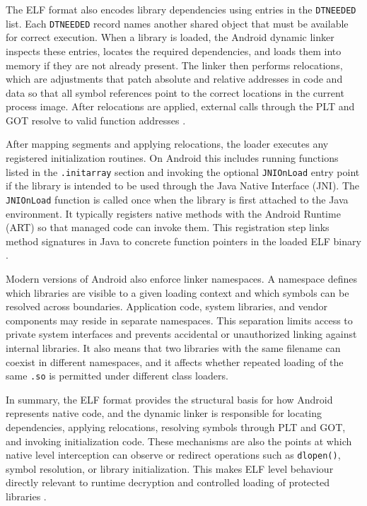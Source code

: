 \documentclass[11pt,a4paper]{report}
\renewcommand\_{{\textunderscore\allowbreak}}
\begin{document}
The ELF format also encodes library dependencies using entries in the \texttt{DT\_NEEDED} list. Each \texttt{DT\_NEEDED} record names another shared object that must be available for correct execution. When a library is loaded, the Android dynamic linker inspects these entries, locates the required dependencies, and loads them into memory if they are not already present. The linker then performs relocations, which are adjustments that patch absolute and relative addresses in code and data so that all symbol references point to the correct locations in the current process image. After relocations are applied, external calls through the PLT and GOT resolve to valid function addresses \cite{xinuos2025elf}.

After mapping segments and applying relocations, the loader executes any registered initialization routines. On Android this includes running functions listed in the \texttt{.init\_array} section and invoking the optional \texttt{JNI\_OnLoad} entry point if the library is intended to be used through the Java Native Interface (JNI). The \texttt{JNI\_OnLoad} function is called once when the library is first attached to the Java environment. It typically registers native methods with the Android Runtime (ART) so that managed code can invoke them. This registration step links method signatures in Java to concrete function pointers in the loaded ELF binary \cite{xinuos2025elf,bleier2023oat}.

Modern versions of Android also enforce linker namespaces. A namespace defines which libraries are visible to a given loading context and which symbols can be resolved across boundaries. Application code, system libraries, and vendor components may reside in separate namespaces. This separation limits access to private system interfaces and prevents accidental or unauthorized linking against internal libraries. It also means that two libraries with the same filename can coexist in different namespaces, and it affects whether repeated loading of the same \texttt{.so} is permitted under different class loaders.

In summary, the ELF format provides the structural basis for how Android represents native code, and the dynamic linker is responsible for locating dependencies, applying relocations, resolving symbols through PLT and GOT, and invoking initialization code. These mechanisms are also the points at which native level interception can observe or redirect operations such as \texttt{dlopen()}, symbol resolution, or library initialization. This makes ELF level behaviour directly relevant to runtime decryption and controlled loading of protected libraries \cite{xinuos2025elf,ronin2018hooking,bleier2023oat}.
\end{document}
